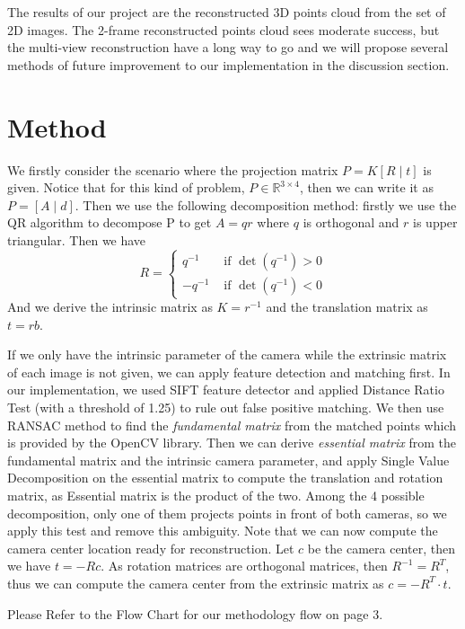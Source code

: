 \documentclass[10pt]{article}
\begin{document}
The results of our project are the reconstructed 3D points cloud from the set of 2D images. The 2-frame reconstructed points cloud sees moderate success, but the multi-view reconstruction have a long way to go and we will propose several methods of future improvement to our implementation in the discussion section.


\section*{Method}

We firstly consider the scenario where the projection matrix $P= K [R\mid t]$ is given. 
Notice that for this kind of problem, $P \in \mathbb{R}^{3 \times 4}$, then we can write it as $P = [A \mid d]$.
Then we use the following decomposition method: firstly we use the QR algorithm to decompose P to get $A = qr$ where $q$ is orthogonal and $r$ is upper triangular. Then we have $$R = \begin{cases}
	q^{-1} & \text{ if } \det(q^{-1})  > 0 \\
	-q^{-1} & \text{ if } \det(q^{-1})  < 0 
\end{cases}$$
And we derive the intrinsic matrix as $K = r^{-1}$ and the translation matrix as $t = rb$. 

If we only have the intrinsic parameter of the camera while the extrinsic matrix of each image is not given, we can apply feature detection and matching first. In our implementation, we used SIFT feature detector and applied Distance Ratio Test (with a threshold of 1.25) to rule out false positive matching. We then use RANSAC method to find the \emph{fundamental matrix} from the matched points which is provided by the OpenCV library. Then we can derive \emph{essential matrix} from the fundamental matrix and the intrinsic camera parameter, and apply Single Value Decomposition on the essential matrix to compute the translation and rotation matrix, as Essential matrix is the product of the two. Among the 4 possible decomposition, only one of them projects points in front of both cameras, so we apply this test and remove this ambiguity. Note that we can now compute the camera center location ready for reconstruction. Let $c$ be the camera center, then we have $t = -Rc$. As rotation matrices are orthogonal matrices, then $R^{-1} = R^T$, thus we can compute the camera center from the extrinsic matrix as $c = - R^T \cdot t$. 


Please Refer to the Flow Chart for our methodology flow on page 3.
\end{document}
